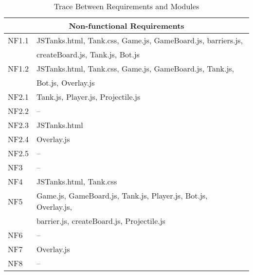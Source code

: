 \documentclass{article}
\begin{document}
\begin{table}[H]
\begin{tabular}{ll}
        \midrule
        \multicolumn{2}{c}{Non-functional Requirements} \\
        \midrule
        NF1.1 & JSTanks.html, Tank.css, Game.js, GameBoard.js, barriers.js,\\
                     & createBoard.js, Tank.js, Bot.js \\
        NF1.2 & JSTanks.html, Tank.css, Game.js, GameBoard.js, Tank.js, \\
                     & Bot.js, Overlay.js \\
        NF2.1 & Tank.js, Player.js, Projectile.js \\
        NF2.2 & -- \\
        NF2.3 & JSTanks.html \\
        NF2.4& Overlay.js \\
        NF2.5 & -- \\
        NF3 & -- \\
        NF4 &JSTanks.html, Tank.css \\
        NF5 & Game.js, GameBoard.js, Tank.js, Player.js, Bot.js, Overlay.js, \\
                 &barrier.js, createBoard.js, Projectile.js \\
        NF6 & -- \\
        NF7 & Overlay.js \\
        NF8 & -- \\
        \bottomrule
        \end{tabular}
        \caption{Trace Between Requirements and Modules}
        \makeatletter
           \def\rulecolor#1#{\CT@arc{#1}}
           \def\CT@arc#1#2{%
           \ifdim\baselineskip=\z@\noalign\fi
           {\gdef\CT@arc@{\color#1{#2}}}}
           \let\CT@arc@\relax
        \makeatother
        \label{Table 2}
        \end{table}
\end{document}
